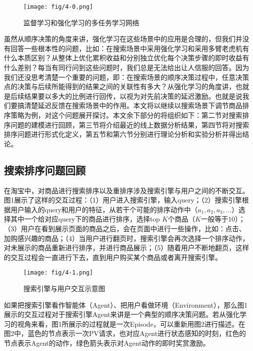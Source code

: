 \begin{figure}[!h]
\centering
\texttt{[image: fig/4-0.png]}
\caption{监督学习和强化学习的多任务学习网络}
\end{figure}


虽然从顺序决策的角度来讲，强化学习在这些场景中的应用是合理的，但我们并没有回答一些根本性的问题，比如：在搜索场景中采用强化学习和采用多臂老虎机有什么本质区别？从整体上优化累积收益和分别独立优化每个决策步骤的即时收益有什么差别？每当有同行问到这些问题时，我们总是无法给出让人信服的回答。因为我们还没思考清楚一个重要的问题，即：在搜索场景的顺序决策过程中，任意决策点的决策与后续所能得到的结果之间的关联性有多大？从强化学习的角度讲，也就是后续结果要以多大的比例进行回传，以视为对先前决策的延迟激励。也就是说我们要搞清楚延迟反馈在搜索场景中的作用。本文将以继续以搜索场景下调节商品排序策略为例，对这个问题展开探讨。本文余下部分的将组织如下：第二节对搜索排序问题的建模进行回顾，第三节将介绍最近的线上数据分析结果，第四节将对搜索排序问题进行形式化定义，第五节和第六节分别进行理论分析和实验分析并得出结论。

\subsection{搜索排序问题回顾}
在淘宝中，对商品进行搜索排序以及重排序涉及搜索引擎与用户之间的不断交互。图1展示了这样的交互过程：（1）用户进入搜索引擎，输入query；（2）搜索引擎根据用户输入的query和用户的特征，从若干个可能的排序动作中（$a_1, a_2, a_3, ...$）选择其中一个给对应query下的商品进行排序，选择top $K$个商品（$K$一般等于$10$）；（3）用户在看到展示页面的商品之后，会在页面中进行一些操作，比如：点击、加购感兴趣的商品；（4）当用户进行翻页时，搜索引擎会再次选择一个排序动作，对未展示的商品重新进行排序，并进行商品展示；（5）随着用户不断地翻页，这样的交互过程会一直进行下去，直到用户购买某个商品或者离开搜索引擎。

\begin{figure}[!h]
\centering
\texttt{[image: fig/4-1.png]}
\caption{搜索引擎与用户交互示意图}
\end{figure}

如果把搜索引擎看作智能体（Agent）、把用户看做环境（Environment），那么图1展示的交互过程对于搜索引擎Agent来讲是一个典型的顺序决策问题。若从强化学习的视角来看，图1所展示的过程就是一次Episode，可以重新用图2进行描述。在图2中，蓝色的节点表示一次PV请求，也对应Agent进行状态感知的时刻，红色的节点表示Agent的动作，绿色箭头表示对Agent动作的即时奖赏激励。


